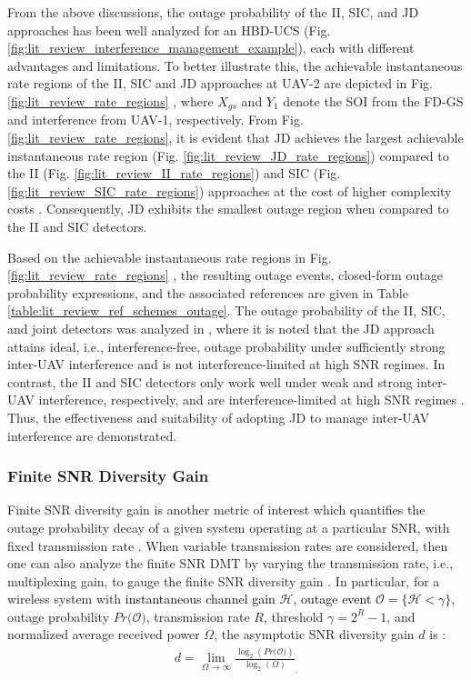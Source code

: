 From the above discussions, the outage probability of the II, SIC, and JD approaches has been well analyzed for an HBD-UCS (Fig. \ref{fig:lit_review_interference_management_example}), each with different advantages and limitations. To better illustrate this, the achievable instantaneous rate regions of the II, SIC and JD approaches at UAV-2 are depicted in Fig. \ref{fig:lit_review_rate_regions} \cite[Fig. 2]{tan2018joint}, where $X_{gs}$ and $Y_{1}$ denote the SOI from the FD-GS and interference from UAV-1, respectively. From Fig. \ref{fig:lit_review_rate_regions}, it is evident that JD achieves the largest achievable instantaneous rate region (Fig. \ref{fig:lit_review_JD_rate_regions}) compared to the II (Fig. \ref{fig:lit_review_II_rate_regions}) and SIC (Fig. \ref{fig:lit_review_SIC_rate_regions}) approaches at the cost of higher complexity costs \cite{tan2018joint}. Consequently, JD exhibits the smallest outage region when compared to the II and SIC detectors. 

Based on the achievable instantaneous rate regions in Fig. \ref{fig:lit_review_rate_regions} \cite[Fig. 2]{tan2018joint}, the resulting outage events, closed-form outage probability expressions, and the associated references are given in Table \ref{table:lit_review_ref_schemes_outage}. The outage probability of the II, SIC, and joint detectors was analyzed in \cite[Fig. 3]{tan2018joint}, where it is noted that the JD approach attains ideal, i.e., interference-free, outage probability under sufficiently strong inter-UAV interference and is not interference-limited at high SNR regimes. In contrast, the II and SIC detectors only work well under weak and strong inter-UAV interference, respectively, and are interference-limited at high SNR regimes \cite{tan2018joint}. Thus, the effectiveness and suitability of adopting JD to manage inter-UAV interference are demonstrated.

\subsubsection{Finite SNR Diversity Gain}
Finite SNR diversity gain is another metric of interest which quantifies the outage probability decay of a given system operating at a particular SNR, with fixed transmission rate \cite{shin2008diversity}. When variable transmission rates are considered, then one can also analyze the finite SNR DMT by varying the transmission rate, i.e., multiplexing gain, to gauge the finite SNR diversity gain \cite{narasimhan2006finite}. In particular, for a wireless system with \textcolor{black}{instantaneous channel gain $\mathcal{H}$, outage event $\mathcal{O} = \{\mathcal{H}<\gamma\}$}, outage probability $Pr\big(\mathcal{O}\big)$, transmission rate $R$, threshold $\gamma = 2^R - 1$, and normalized average received power $\Omega$, the asymptotic SNR diversity gain $d$ is \cite{zheng2003diversity}:
\begin{eqnarray} \label{lit_review_asymp_diversity_gain}
 d = \lim_{\Omega\to\infty} \frac{\log_2(Pr\big(\mathcal{O}\big))}{\log_2(\Omega)}_.
\end{eqnarray}

